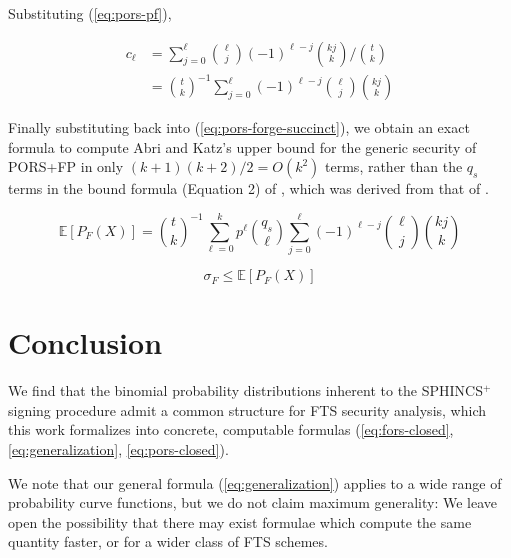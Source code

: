 \documentclass[11pt]{article}
\newcommand{\spx}{SPHINCS$^+$\xspace}
\begin{document}
Substituting (\ref{eq:pors-pf}),

\begin{align}
  c_\ell
    &= \sum_{j = 0}^\ell \binom{\ell}{j} (-1)^{\ell - j} \binom{k j}{k} / \binom{t}{k} \\
    &= \binom{t}{k}^{-1} \sum_{j = 0}^\ell (-1)^{\ell - j} \binom{\ell}{j} \binom{k j}{k}
\end{align}

Finally substituting back into (\ref{eq:pors-forge-succinct}), we obtain an exact formula to compute Abri and Katz's upper bound for the generic security of PORS+FP in only $(k+1)(k+2)/2 = O(k^2)$ terms, rather than the $q_s$ terms in the bound formula (Equation 2) of \cite{forced_pruning}, which was derived from that of \cite{sphincsplus}.

\begin{equation}
\label{eq:pors-closed}
\boxed{
  \mathbb E[P_F(X)] = \binom{t}{k}^{-1} \sum_{\ell=0}^k p^\ell \binom{q_s}{\ell} \sum_{j = 0}^\ell (-1)^{\ell - j} \binom{\ell}{j} \binom{k j}{k}
}
\end{equation}

\begin{equation}
  \sigma_F \le \mathbb E[P_F(X)]
\end{equation}

\section{Conclusion}

We find that the binomial probability distributions inherent to the \spx signing procedure admit a common structure for FTS security analysis, which this work formalizes into concrete, computable formulas (\ref{eq:fors-closed}, \ref{eq:generalization}, \ref{eq:pors-closed}).

We note that our general formula (\ref{eq:generalization}) applies to a wide range of probability curve functions, but we do not claim maximum generality: We leave open the possibility that there may exist formulae which compute the same quantity faster, or for a wider class of FTS schemes.

\newpage


\end{document}
